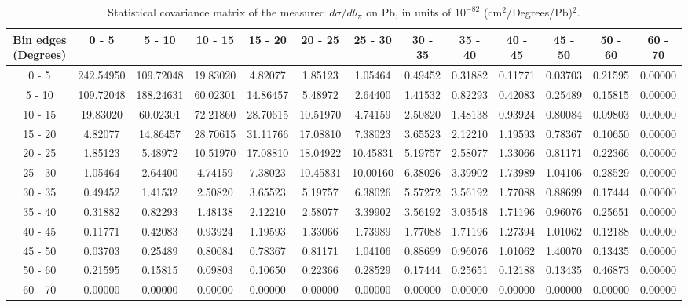 \documentclass[aps,prl,twocolumn,superscriptaddress,nofootinbib]{revtex4-1}
\begin{document}
\begin{turnpage}
 \begin{table}[h!]
  \centering
  \caption{Statistical covariance matrix of the measured $d\sigma/d\theta_{\pi}$ on Pb, in units of $10^{-82}$ (cm$^{2}$/Degrees/Pb)$^{2}$.}
    \begin{tabular}{c||cccccccccccc}
      Bin edges (Degrees) & 0 - 5 & 5 - 10 & 10 - 15 & 15 - 20 & 20 - 25 & 25 - 30 & 30 - 35 & 35 - 40 & 40 - 45 & 45 - 50 & 50 - 60 & 60 - 70 \\
\hline \hline
        0 - 5 & 242.54950 & 109.72048 & 19.83020 &  4.82077 &  1.85123 &  1.05464 &  0.49452 &  0.31882 &  0.11771 &  0.03703 &  0.21595 &  0.00000 \\
       5 - 10 & 109.72048 & 188.24631 & 60.02301 & 14.86457 &  5.48972 &  2.64400 &  1.41532 &  0.82293 &  0.42083 &  0.25489 &  0.15815 &  0.00000 \\
      10 - 15 & 19.83020 & 60.02301 & 72.21860 & 28.70615 & 10.51970 &  4.74159 &  2.50820 &  1.48138 &  0.93924 &  0.80084 &  0.09803 &  0.00000 \\
      15 - 20 &  4.82077 & 14.86457 & 28.70615 & 31.11766 & 17.08810 &  7.38023 &  3.65523 &  2.12210 &  1.19593 &  0.78367 &  0.10650 &  0.00000 \\
      20 - 25 &  1.85123 &  5.48972 & 10.51970 & 17.08810 & 18.04922 & 10.45831 &  5.19757 &  2.58077 &  1.33066 &  0.81171 &  0.22366 &  0.00000 \\
      25 - 30 &  1.05464 &  2.64400 &  4.74159 &  7.38023 & 10.45831 & 10.00160 &  6.38026 &  3.39902 &  1.73989 &  1.04106 &  0.28529 &  0.00000 \\
      30 - 35 &  0.49452 &  1.41532 &  2.50820 &  3.65523 &  5.19757 &  6.38026 &  5.57272 &  3.56192 &  1.77088 &  0.88699 &  0.17444 &  0.00000 \\
      35 - 40 &  0.31882 &  0.82293 &  1.48138 &  2.12210 &  2.58077 &  3.39902 &  3.56192 &  3.03548 &  1.71196 &  0.96076 &  0.25651 &  0.00000 \\
      40 - 45 &  0.11771 &  0.42083 &  0.93924 &  1.19593 &  1.33066 &  1.73989 &  1.77088 &  1.71196 &  1.27394 &  1.01062 &  0.12188 &  0.00000 \\
      45 - 50 &  0.03703 &  0.25489 &  0.80084 &  0.78367 &  0.81171 &  1.04106 &  0.88699 &  0.96076 &  1.01062 &  1.40070 &  0.13435 &  0.00000 \\
      50 - 60 &  0.21595 &  0.15815 &  0.09803 &  0.10650 &  0.22366 &  0.28529 &  0.17444 &  0.25651 &  0.12188 &  0.13435 &  0.46873 &  0.00000 \\
      60 - 70 &  0.00000 &  0.00000 &  0.00000 &  0.00000 &  0.00000 &  0.00000 &  0.00000 &  0.00000 &  0.00000 &  0.00000 &  0.00000 &  0.00000 \\
    \end{tabular}
  \label{tablecov:Pb_Statistical_ThetaPi}
  \end{table}
\end{turnpage}
\end{document}
